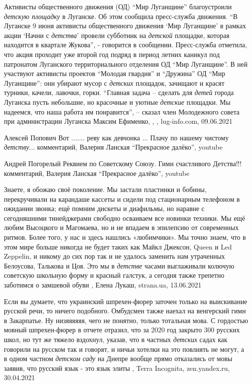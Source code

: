 Активисты общественного движения (ОД) \enquote{Мир Луганщине} благоустроили
\emph{детскую площадку} в Луганске. Об этом сообщила пресс-служба движения.
\enquote{В Луганске 9 июня активисты общественного движения \enquote{Мир
Луганщине} в рамках акции \enquote{Начни с \emph{детства}} провели субботник на
\emph{детской} площадке, которая находится в квартале Жукова}, - говорится в
сообщении.  Пресс-служба отметила, что акция проходит уже второй год подряд в
период летних каникул под патронатом Луганского территориального отделения ОД
\enquote{Мир Луганщине}. В ней участвуют активисты проектов \enquote{Молодая
гвардия} и \enquote{Дружина} ОД \enquote{Мир Луганщине}: они убирают мусор с
\emph{детских} площадок, зачищают и красят турники, качели, лавочки, горки.
\enquote{Главная задача – сделать для \emph{детей} города Луганска пусть
небольшие, но красочные и уютные \emph{детские} площадки. Мы надеемся, что наша
работа им понравится}, – сказал член Молодежного совета при администрации
Луганска Максим Ефименко,
, , lug-info.com, 09.06.2021

Алексей Попович
Вот  ....... реву как девчонка ... Плачу по нашему чистому \emph{детству}...
комментарий, Валерия Ланская \enquote{Прекрасное далёко}, youtube

Андрей Погорелый
Реквием по Советскому Союзу. Гимн счастливого Детства!!!
комментарий, Валерия Ланская \enquote{Прекрасное далёко}, youtube

Знаете, я обожаю своё поколение.  Мы застали пластинки и бобины, перекручивали
на карандаше кассеты и сидели под стационарным телефоном в ожидании звонка; ещё
помним дискеты и диафильмы, но наравне с сегодняшними тинейджерами свободно
осваиваем все новинки техники.  Мы ещё любим Высоцкого и Магомаева, но и не
впадаем в эпилепсию от современных ритмов.  Более того, у нас и здесь нашлись
«любимчики».  Мы точно знаем, что в этом мире больше никогда не будет таких как
Майкл Джексон, Queen и Led Zeppelin, и никому до сих пор так и не удалось
заменить нам утраченных Белоусова, Талькова и Цоя.  Это мы в \emph{детстве} часами
выглаживали колючую советскую школьную форму и красный галстук, а сегодня также
трепетно заботимся о замшевой обуви
, 
Елена Лукаш, strana.ua, 13.06.2021

Если вы думаете, что украинский шпрехен-фюрер заточен только на выискивание
русской речи, то ничего подобного. Омбудсмен также наехал на венгерский гимн в
Закарпатье. Ну низяяяяяя, чего не понятно, только тотальная мова.  С гордостью
мовный шпрехен-фюрер в отчете отразил, что за 2020 год закрыто 300 русских
школ, но тут же тяжело вздохнул, указав, что в частных \emph{детских} садах как
говорили на русском так и говорят, и ничьи хотелки на это повлиять не могут, а
в одном частном \emph{детском саду} на Днепре вообще прямо отказались от мовы
заявив, что русский язык - это язык элиты
, 
Terra Incognita, zen.yandex.ru, 30.04.2021

